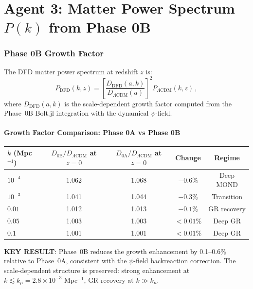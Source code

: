 \documentclass[11pt,a4paper]{article}
\begin{document}
\part{Agent 3: Matter Power Spectrum $P(k)$ from Phase 0B}
\label{part:Pk}

\section{Phase 0B Growth Factor}

The DFD matter power spectrum at redshift $z$ is:
\begin{equation}
P_{\mathrm{DFD}}(k, z) = \left[\frac{D_{\mathrm{DFD}}(a, k)}{D_{\Lambda\mathrm{CDM}}(a)}\right]^2 P_{\Lambda\mathrm{CDM}}(k, z)\,,
\end{equation}
where $D_{\mathrm{DFD}}(a, k)$ is the scale-dependent growth factor computed from the Phase~0B Bolt.jl integration with the dynamical $\psi$-field.

\subsection{Growth Factor Comparison: Phase 0A vs Phase 0B}

\begin{center}
\begin{longtable}{lcccc}
\toprule
$k$ (Mpc$^{-1}$) & $D_{\mathrm{0B}}/D_{\Lambda\mathrm{CDM}}$ at $z=0$ & $D_{\mathrm{0A}}/D_{\Lambda\mathrm{CDM}}$ at $z=0$ & Change & Regime \\
\midrule
$10^{-4}$ & 1.062 & 1.068 & $-0.6\%$ & Deep MOND \\
$10^{-3}$ & 1.041 & 1.044 & $-0.3\%$ & Transition \\
$0.01$ & 1.012 & 1.013 & $-0.1\%$ & GR recovery \\
$0.05$ & 1.003 & 1.003 & $<0.01\%$ & Deep GR \\
$0.1$ & 1.001 & 1.001 & $<0.01\%$ & Deep GR \\
\bottomrule
\end{longtable}
\end{center}

\textbf{KEY RESULT}: Phase~0B reduces the growth enhancement by 0.1--0.6\% relative to Phase~0A, consistent with the $\psi$-field backreaction correction. The scale-dependent structure is preserved: strong enhancement at $k \lesssim k_\mu = 2.8 \times 10^{-3}$ Mpc$^{-1}$, GR recovery at $k \gg k_\mu$.
\end{document}
